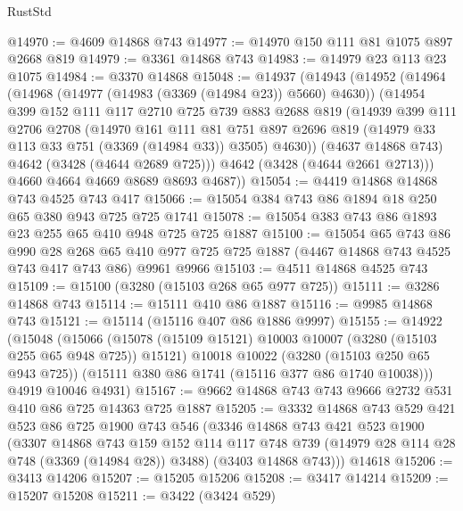 \begin{lexlean}{RustStd}
\begin{coremodule}
@14970 := @4609 @14868 @743
@14977 := @14970 @150 @111 @81 @1075 @897 @2668 @819
@14979 := @3361 @14868 @743
@14983 := @14979 @23 @113 @23 @1075
@14984 := @3370 @14868
@15048 := @14937
    (@14943
      (@14952
        (@14964
          (@14968 (@14977 (@14983 (@3369 (@14984 @23)) @5660) @4630))
          (@14954
            @399
            @152
            @111
            @117
            @2710
            @725
            @739
            @883
            @2688
            @819
            (@14939
              @399
              @111
              @2706
              @2708
              (@14970
                @161
                @111
                @81
                @751
                @897
                @2696
                @819
                (@14979 @33 @113 @33 @751 (@3369 (@14984 @33)) @3505)
                @4630))
            (@4637 @14868 @743)
            @4642
            (@3428 (@4644 @2689 @725)))
          @4642
          (@3428 (@4644 @2661 @2713)))
        @4660
        @4664
        @4669
        @8689
        @8693
        @4687))
@15054 := @4419 @14868 @14868 @743 @4525 @743 @417
@15066 := @15054 @384 @743 @86 @1894 @18 @250 @65 @380 @943 @725 @725 @1741
@15078 := @15054 @383 @743 @86 @1893 @23 @255 @65 @410 @948 @725 @725 @1887
@15100 := @15054
    @65
    @743
    @86
    @990
    @28
    @268
    @65
    @410
    @977
    @725
    @725
    @1887
    (@4467 @14868 @743 @4525 @743 @417 @743 @86)
    @9961
    @9966
@15103 := @4511 @14868 @4525 @743
@15109 := @15100 (@3280 (@15103 @268 @65 @977 @725))
@15111 := @3286 @14868 @743
@15114 := @15111 @410 @86 @1887
@15116 := @9985 @14868 @743
@15121 := @15114 (@15116 @407 @86 @1886 @9997)
@15155 := @14922
    (@15048
      (@15066
        (@15078 (@15109 @15121) @10003 @10007 (@3280 (@15103 @255 @65 @948 @725)) @15121)
        @10018
        @10022
        (@3280 (@15103 @250 @65 @943 @725))
        (@15111 @380 @86 @1741 (@15116 @377 @86 @1740 @10038)))
      @4919
      @10046
      @4931)
@15167 := @9662 @14868 @743 @743 @9666 @2732 @531 @410 @86 @725 @14363 @725 @1887
@15205 := @3332
    @14868
    @743
    @529
    @421
    @523
    @86
    @725
    @1900
    @743
    @546
    (@3346
      @14868
      @743
      @421
      @523
      @1900
      (@3307
        @14868
        @743
        @159
        @152
        @114
        @117
        @748
        @739
        (@14979 @28 @114 @28 @748 (@3369 (@14984 @28)) @3488)
        (@3403 @14868 @743)))
    @14618
@15206 := @3413 @14206
@15207 := @15205 @15206
@15208 := @3417 @14214
@15209 := @15207 @15208
@15211 := @3422 (@3424 @529)

\end{coremodule}
\end{lexlean}
